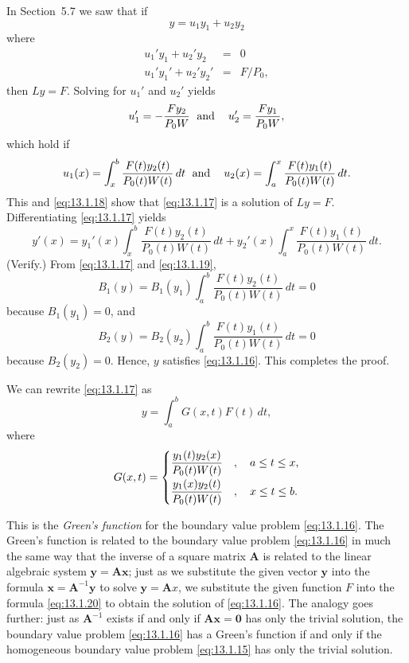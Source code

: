 \medskip
\proof In Section~5.7 we saw that if
\begin{equation}
  \label{eq:13.1.18}y=u_{1}y_{1}+u_{2}y_{2}
\end{equation}
where
\begin{eqnarray*}
  u_{1}'y_{1}+u_{2}'y_{2}   & = & 0 \\
  u_{1}'y_{1}'+u_{2}'y_{2}' & = & F/P_{0},
\end{eqnarray*}
then $Ly=F$. Solving for $u_{1}'$ and $u_{2}'$ yields
\[
  u_{1}'=-\frac{Fy_{2}}{P_{0}W}\text{\; and\; \; }u_{2}'=\frac{Fy_{1}}{P_{0}W},
\]
which hold if
\[
  u_{1}(x)=\int_{x}^{b}\frac{F(t)y_{2}(t)}{P_{0}(t)W(t)}\,dt \text{\; and\; \; }u_{2}(x)=\int_{a}^{x}\frac{F(t)y_{1}(t)}{P_{0}(t)W(t)}\,dt.
\]
This and \eqref{eq:13.1.18} show that \eqref{eq:13.1.17} is a solution of $Ly=F$. Differentiating
\eqref{eq:13.1.17} yields
\begin{equation}
  \label{eq:13.1.19}y'(x)=y_{1}'(x)\int_{x}^{b}\frac{F(t)y_{2}(t)}{P_{0}(t)W(t)}\,dt+ y_{2}'(x)\int_{a}^{x}\frac{F(t)y_{1}(t)}{P_{0}(t)W(t)}\,dt.
\end{equation}
(Verify.) From \eqref{eq:13.1.17} and \eqref{eq:13.1.19},
\[
  B_{1}(y)=B_{1}(y_{1})\int_{a}^{b}\frac{F(t)y_{2}(t)}{P_{0}(t)W(t)}\,dt=0
\]
because $B_{1}(y_{1})=0$, and
\[
  B_{2}(y)=B_{2}(y_{2})\int_{a}^{b}\frac{F(t)y_{1}(t)}{P_{0}(t)W(t)}\,dt=0
\]
because $B_{2}(y_{2})=0$. Hence, $y$ satisfies \eqref{eq:13.1.16}. This completes the proof.

We can rewrite \eqref{eq:13.1.17} as
\begin{equation}
  \label{eq:13.1.20}y=\int_{a}^{b}G(x,t)F(t)\,dt,
\end{equation}
where
\[
  G(x,t)=
  \begin{cases}
    \displaystyle{\frac{y_{1}(t)y_{2}(x)}{P_{0}(t)W(t)}} & ,\quad a\le t\le x, \\[.1in]
    \displaystyle{\frac{y_{1}(x)y_{2}(t)}{P_{0}(t)W(t)}} & ,\quad x\le t\le b.
  \end{cases}
\]

This is the \emph{Green's function} for the boundary value problem \eqref{eq:13.1.16}. The Green's
function is related to the boundary value problem \eqref{eq:13.1.16} in much the same way that the
inverse of a square matrix ${\mathbf{A}}$ is related to the linear algebraic system
${\mathbf{y}}={\mathbf{A}}{\mathbf{x}}$; just as we substitute the given vector ${\mathbf{y}}$ into
the formula ${\mathbf{x}}={\mathbf{A}}^{-1}{\mathbf{y}}$ to solve ${\mathbf{y}}={\mathbf{A}x}$, we
substitute the given function $F$ into the formula \eqref{eq:13.1.20} to obtain the solution of
\eqref{eq:13.1.16}. The analogy goes further: just as ${\mathbf{A}}^{-1}$ exists if and only if
${\mathbf{A}}{\mathbf{x}}={\mathbf{0}}$ has only the trivial solution, the boundary value problem
\eqref{eq:13.1.16} has a Green's function if and only if the homogeneous boundary value problem
\eqref{eq:13.1.15} has only the trivial solution.

